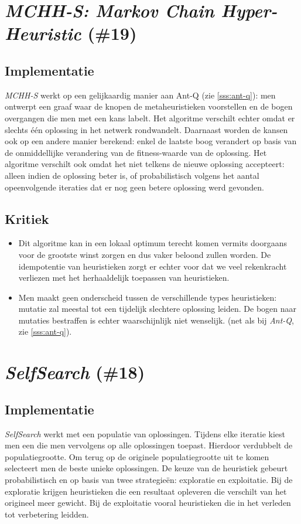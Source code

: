 \section{\emph{MCHH-S: Markov Chain Hyper-Heuristic} (\#19)}
\label{sss:mchh-s}
\subsection{Implementatie}
\emph{MCHH-S}\cite{chesc-mchh-s,conf/gecco/McClymontK11} werkt op een gelijkaardig manier aan Ant-Q (zie \ref{sss:ant-q}): men ontwerpt een graaf waar de knopen de metaheuristieken voorstellen en de bogen overgangen die men met een kans labelt. Het algoritme verschilt echter omdat er slechts \'e\'en oplossing in het netwerk rondwandelt. Daarnaast worden de kansen ook op een andere manier berekend: enkel de laatste boog verandert op basis van de onmiddellijke verandering van de fitness-waarde van de oplossing. Het algoritme verschilt ook omdat het niet telkens de nieuwe oplossing accepteert: alleen indien de oplossing beter is, of probabilistisch volgens het aantal opeenvolgende iteraties dat er nog geen betere oplossing werd gevonden.
\subsection{Kritiek}
\begin{itemize}
 \item Dit algoritme kan in een lokaal optimum terecht komen vermits \abls{} doorgaans voor de grootste winst zorgen en dus vaker beloond zullen worden. De idempotentie van \abls{} heuristieken zorgt er echter voor dat we veel rekenkracht verliezen met het herhaaldelijk toepassen van \abls{} heuristieken.
 \item Men maakt geen onderscheid tussen de verschillende types heuristieken: mutatie zal meestal tot een tijdelijk slechtere oplossing leiden. De bogen naar mutaties bestraffen is echter waarschijnlijk niet wenselijk. (net als bij \emph{Ant-Q}, zie \ref{sss:ant-q}).
\end{itemize}
\section{\emph{SelfSearch} (\#18)}
\label{sss:selfsearch}
\subsection{Implementatie}
\emph{SelfSearch}\cite{chesc-selfsearch} werkt met een populatie van oplossingen. Tijdens elke iteratie kiest men een \abllh{} die men vervolgens op alle oplossingen toepast. Hierdoor verdubbelt de populatiegrootte. Om terug op de originele populatiegrootte uit te komen selecteert men de beste unieke oplossingen. De keuze van de heuristiek gebeurt probabilistisch en op basis van twee strategie\"en: exploratie en exploitatie. Bij de exploratie krijgen heuristieken die een resultaat opleveren die verschilt van het origineel meer gewicht. Bij de exploitatie vooral heuristieken die in het verleden tot verbetering leidden.
